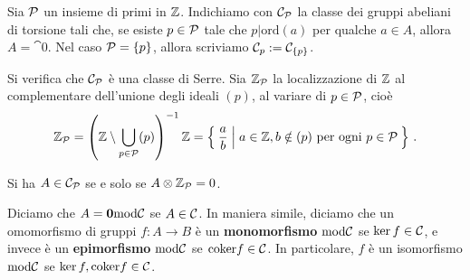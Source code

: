\begin{df}
	Sia $\mathcal{P}$ un insieme di primi in ${\mathbb Z}$. Indichiamo con $\mathcal{C}_{\mathcal{P}}$
	la classe dei gruppi abeliani di torsione tali che,
	se esiste $p \in \mathcal{P}$ tale che $p \vert \mathrm{ord}(a)$ per qualche $a \in A$,
	allora $A = \cat{0}$.
	Nel caso $\mathcal{P} = \{p\}$, allora scriviamo $\mathcal{C}_{p} := \mathcal{C}_{\{p\}}$.
\end{df}

Si verifica che $\mathcal{C}_{\mathcal{P}}$ è una classe di Serre.
Sia ${\mathbb Z}_{\mathcal{P}}$ la localizzazione di ${\mathbb Z}$ al complementare
dell'unione degli ideali $(p)$, al variare di $p \in \mathcal{P}$,
cioè
\begin{equation*}
	{\mathbb Z}_{\mathcal{P}} = \left( {\mathbb Z} \setminus \bigcup_{p \in \mathcal{P}} (p) \right)^{-1} {\mathbb Z}
	= \Set{\frac{a}{b} | a \in {\mathbb Z}, b \notin (p)\text{ per ogni } p \in \mathcal{P}}\,.
\end{equation*}

\begin{rmk}
	Si ha $A \in \mathcal{C}_{\mathcal{P}}$ se e solo se $A \otimes {\mathbb Z}_{\mathcal{P}} = 0$.  
\end{rmk}


\begin{df}
	Diciamo che $A={\normalfont\textbf{0}} \mathrm{mod} \mathcal{C}$ se $A \in \mathcal{C}$.
	In maniera simile, diciamo che un omomorfismo
	di gruppi $f:A \to B$ è un \textbf{monomorfismo} $\mathrm{mod} \mathcal{C}$
	se $\ker f \in \mathcal{C}$, e invece è un \textbf{epimorfismo} $\mathrm{mod} \mathcal{C}$
	se $\mathrm{coker} f \in \mathcal{C}$. In particolare,
	$f$ è un isomorfismo $\mathrm{mod} \mathcal{C}$ se
	$\ker f, \mathrm{coker} f \in \mathcal{C}$.
\end{df}

